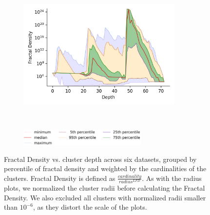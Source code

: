 \documentclass[review,supplement,onefignum,onetabnum]{siamonline220329}
\begin{document}
\begin{figure}
\begin{subfigure}[b]{0.47\textwidth}
        \label{fig:supplement:silva-fractal_density}
    \end{subfigure}%
    \begin{subfigure}[b]{0.47\textwidth}
        \includegraphics[width=0.9\textwidth]{images/fractal_density/radio-ml.png}\\
        \label{fig:supplement:radioml-fractal_density}
    \end{subfigure}%
    \\
    \vskip 0.005in
    \begin{subfigure}[b]{0.94\textwidth}
        \centering
        \includegraphics[width=0.7\textwidth]{images/fractal_density/legend.png}
        \label{fig:supplement:fractal_density-legend}
    \end{subfigure}%
    \caption{Fractal Density vs. cluster depth across six datasets, grouped by percentile of fractal density and weighted by the cardinalities of the clusters.
    Fractal Density is defined as $\frac{cardinality}{radius^{LFD}}$.
    As with the radius plots, we normalized the cluster radii before calculating the Fractal Density.
    We also excluded all clusters with normalized radii smaller than $10^{-6}$, as they distort the scale of the plots.}
    \label{fig:supplement:fractal_density-plots}
\end{figure}




\end{document}
